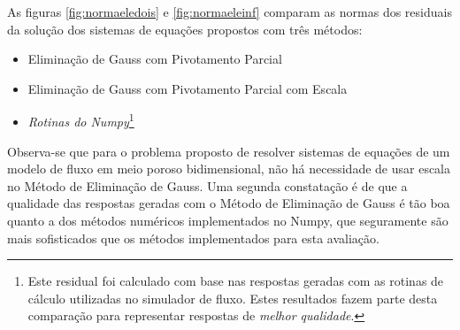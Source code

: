 \documentclass[final,5p]{elsarticle}
\numberwithin{equation}{section}
\begin{document}
        As figuras \ref{fig:normaeledois} e \ref{fig:normaeleinf} comparam as normas dos residuais da solução dos sistemas de equações propostos com três métodos:
        \begin{itemize}
            \item Eliminação de Gauss com Pivotamento Parcial
            \item Eliminação de Gauss com Pivotamento Parcial com Escala
            \item \emph{Rotinas do Numpy}\footnote{Este residual foi calculado com base nas respostas geradas com as rotinas de cálculo utilizadas no simulador de fluxo. Estes resultados fazem parte desta comparação para representar respostas de \emph{melhor qualidade}.}
        \end{itemize}

        Observa-se que para o problema proposto de resolver sistemas de equações de um modelo de fluxo em meio poroso bidimensional, não há necessidade de usar escala no Método de Eliminação de Gauss. Uma segunda constatação é de que a qualidade das respostas geradas com o Método de Eliminação de Gauss é tão boa quanto a dos métodos numéricos implementados no Numpy, que seguramente são mais sofisticados que os métodos implementados para esta avaliação.

\end{document}
